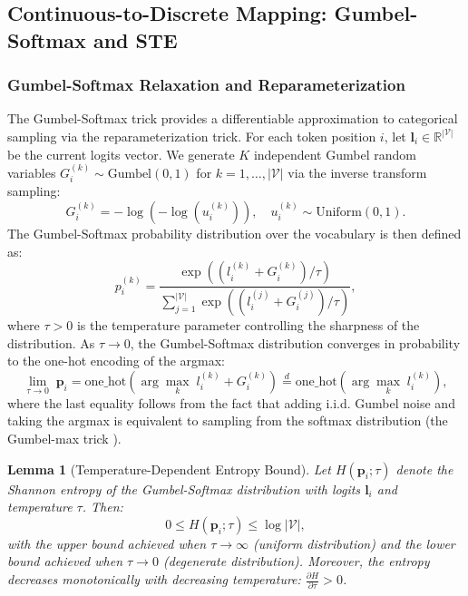 \documentclass[preprint,12pt]{elsarticle}
\newtheorem{lemma}{Lemma}[section]
\begin{document}
\subsection{Continuous-to-Discrete Mapping: Gumbel-Softmax and STE}
\label{sec:gumbel_ste}

\subsubsection{Gumbel-Softmax Relaxation and Reparameterization}
\label{sec:gumbel}

The Gumbel-Softmax trick \cite{jang2017categorical, maddison2017concrete} provides a differentiable approximation to categorical sampling via the reparameterization trick. For each token position $i$, let $\mathbf{l}_i \in \mathbb{R}^{|\mathcal{V}|}$ be the current logits vector. We generate $K$ independent Gumbel random variables $G_i^{(k)} \sim \text{Gumbel}(0, 1)$ for $k = 1, \ldots, |\mathcal{V}|$ via the inverse transform sampling:
\begin{equation}
\label{eq:gumbel_sample}
G_i^{(k)} = -\log(-\log(u_i^{(k)})), \quad u_i^{(k)} \sim \text{Uniform}(0, 1).
\end{equation}
The Gumbel-Softmax probability distribution over the vocabulary is then defined as:
\begin{equation}
\label{eq:gumbel_softmax}
p_i^{(k)} = \frac{\exp\left((l_i^{(k)} + G_i^{(k)}) / \tau\right)}{\sum_{j=1}^{|\mathcal{V}|} \exp\left((l_i^{(j)} + G_i^{(j)}) / \tau\right)},
\end{equation}
where $\tau > 0$ is the temperature parameter controlling the sharpness of the distribution. As $\tau \to 0$, the Gumbel-Softmax distribution converges in probability to the one-hot encoding of the argmax:
\begin{equation}
\label{eq:gumbel_limit}
\lim_{\tau \to 0} \; \mathbf{p}_i = \text{one\_hot}\left(\arg\max_{k} \; l_i^{(k)} + G_i^{(k)}\right) \overset{d}{=} \text{one\_hot}\left(\arg\max_{k} \; l_i^{(k)}\right),
\end{equation}
where the last equality follows from the fact that adding i.i.d. Gumbel noise and taking the argmax is equivalent to sampling from the softmax distribution (the Gumbel-max trick \cite{gumbel1954statistical}).

\begin{lemma}[Temperature-Dependent Entropy Bound]
\label{lem:entropy}
Let $H(\mathbf{p}_i; \tau)$ denote the Shannon entropy of the Gumbel-Softmax distribution with logits $\mathbf{l}_i$ and temperature $\tau$. Then:
\begin{equation}
\label{eq:entropy_bound}
0 \leq H(\mathbf{p}_i; \tau) \leq \log |\mathcal{V}|,
\end{equation}
with the upper bound achieved when $\tau \to \infty$ (uniform distribution) and the lower bound achieved when $\tau \to 0$ (degenerate distribution). Moreover, the entropy decreases monotonically with decreasing temperature: $\frac{\partial H}{\partial \tau} > 0$.
\end{lemma}
\end{document}
